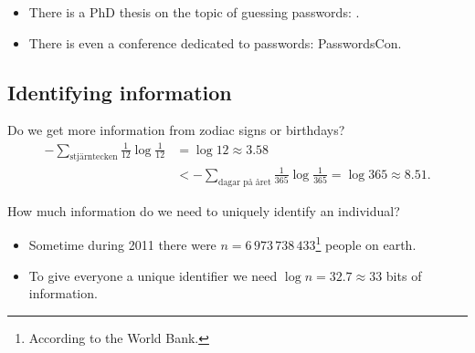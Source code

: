 \documentclass{beamer}
\begin{document}
\begin{frame}
  \begin{remark}
    \begin{itemize}
      \item There is a PhD thesis on the topic of guessing passwords: 
        .
      \item There is even a conference dedicated to passwords: PasswordsCon.
    \end{itemize}
  \end{remark}
\end{frame}

\subsection{Identifying information}

\begin{frame}
  \begin{example}
    Do we get more information from zodiac signs or birthdays?
    \begin{align*}
      -\sum_{\text{stjärntecken}} \frac{1}{12} \log\frac{1}{12} &= \log 12 
      \approx 3.58 \\
      &< -\sum_{\text{dagar på året}} \frac{1}{365} \log\frac{1}{365} = \log 
      365 \approx 8.51.
    \end{align*}
  \end{example}
\end{frame}

\begin{frame}
  \begin{exercise}
    How much information do we need to uniquely identify an individual?
  \end{exercise}
\end{frame}

\begin{frame}
  \begin{example}
    \begin{itemize}
      \item Sometime during 2011 there were \(n = 6\,973\,738\,433\)\footnote{%
          According to the World Bank.
        } people on earth.

      \item To give everyone a unique identifier we need \(\log n = 32.7\approx 
          33\) bits of information.
    \end{itemize}
  \end{example}
\end{frame}
\end{document}
